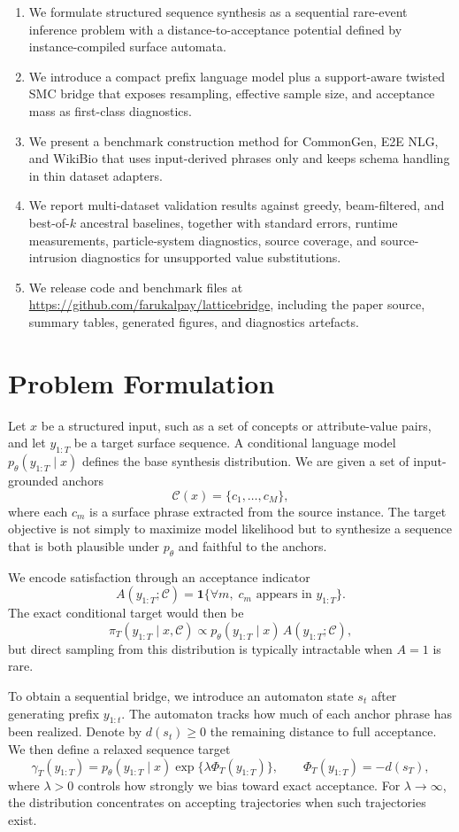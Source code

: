 \documentclass[11pt]{article}
\begin{document}
\begin{enumerate}[leftmargin=1.5em]
  \item We formulate structured sequence synthesis as a sequential rare-event inference problem with a distance-to-acceptance potential defined by instance-compiled surface automata.
  \item We introduce a compact prefix language model plus a support-aware twisted SMC bridge that exposes resampling, effective sample size, and acceptance mass as first-class diagnostics.
  \item We present a benchmark construction method for CommonGen, E2E NLG, and WikiBio that uses input-derived phrases only and keeps schema handling in thin dataset adapters.
  \item We report multi-dataset validation results against greedy, beam-filtered, and best-of-$k$ ancestral baselines, together with standard errors, runtime measurements, particle-system diagnostics, source coverage, and source-intrusion diagnostics for unsupported value substitutions.
  \item We release code and benchmark files at \url{https://github.com/farukalpay/latticebridge}, including the paper source, summary tables, generated figures, and diagnostics artefacts.
\end{enumerate}

\section{Problem Formulation}
Let $x$ be a structured input, such as a set of concepts or attribute-value pairs, and let $y_{1:T}$ be a target surface sequence. A conditional language model $p_\theta(y_{1:T}\mid x)$ defines the base synthesis distribution. We are given a set of input-grounded anchors
\[
\mathcal{C}(x)=\{c_1,\dots,c_M\},
\]
where each $c_m$ is a surface phrase extracted from the source instance. The target objective is not simply to maximize model likelihood but to synthesize a sequence that is both plausible under $p_\theta$ and faithful to the anchors.

We encode satisfaction through an acceptance indicator
\[
A(y_{1:T};\mathcal{C}) = \mathbf{1}\{\forall m,\; c_m \text{ appears in } y_{1:T}\}.
\]
The exact conditional target would then be
\[
\pi_T(y_{1:T}\mid x,\mathcal{C}) \propto p_\theta(y_{1:T}\mid x)\,A(y_{1:T};\mathcal{C}),
\]
but direct sampling from this distribution is typically intractable when $A=1$ is rare.

To obtain a sequential bridge, we introduce an automaton state $s_t$ after generating prefix $y_{1:t}$. The automaton tracks how much of each anchor phrase has been realized. Denote by $d(s_t)\geq 0$ the remaining distance to full acceptance. We then define a relaxed sequence target
\[
\gamma_T(y_{1:T}) = p_\theta(y_{1:T}\mid x)\exp\{\lambda \Phi_T(y_{1:T})\},
\qquad
\Phi_T(y_{1:T}) = -d(s_T),
\]
where $\lambda>0$ controls how strongly we bias toward exact acceptance. For $\lambda\rightarrow\infty$, the distribution concentrates on accepting trajectories when such trajectories exist.
\end{document}

